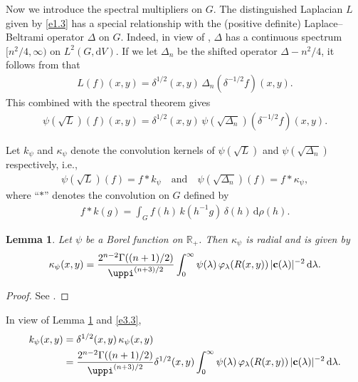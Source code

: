 \documentclass[a4paper,12pt]{amsart}
\numberwithin{equation}{section}
\newtheorem{lemma}[theorem]{Lemma}
\theoremstyle{definition}
\theoremstyle{remark}
\numberwithin{theorem}{section}
\newcommand{\R}{\mathbb{R}}
\newcommand{\dV}{\mathrm{d}V}
\newcommand{\bc}{\mathbf{c}}
\renewcommand{\d}{\mathrm{d}}
\begin{document}
Now we introduce the spectral multipliers on $G$. The distinguished Laplacian $L$ given by \eqref{e1.3} has a special relationship with the (positive definite) Laplace--Beltrami operator $\Delta $ on $G$. Indeed, in view of \cite[p. 177]{Da}, $\Delta$ has a continuous spectrum $[n^2/4,\infty)$ on $L^2(G,\dV)$. If we let $\Delta_n$ be the shifted operator $\Delta-n^2/4$, it follows from \cite[Proposition 2]{As} that
\begin{align*}
L(f)(x,y)=\delta^{1/2}(x,y)\, \Delta_n(\delta^{-1/2} f)(x,y).
\end{align*}
This combined with the spectral theorem gives
\begin{align}\label{e3.3}
\psi(\sqrt{L})(f)(x,y)=\delta^{1/2}(x,y)\,\psi(\sqrt{\Delta_n})(\delta^{-1/2}f)(x,y).
\end{align}

Let $k_\psi$ and $\kappa_\psi$ denote the convolution kernels of $\psi(\sqrt{L})$ and $\psi(\sqrt{\Delta_n})$ respectively, i.e.,
\begin{align*}
\psi(\sqrt{L})(f)=f*k_\psi\quad\mbox{and}\quad \psi(\sqrt{\Delta_n})(f)=f*\kappa_\psi,
\end{align*}
where ``$*$'' denotes the convolution on $G$ defined by
\begin{align}\label{con}
f*k(g)=\int_G f(h)\,k(h^{-1} g)\,\delta(h)\,\d\rho(h).
\end{align}
\begin{lemma}\label{lem3.1}
Let $\psi$ be a Borel function on $\R_+$. Then $\kappa_\psi$ is radial and is given by
\begin{align*}
\kappa_\psi(x,y)={2^{n-2}\Gamma((n+1)/2)\over\uppi^{(n+3)/2}}\int_0^\infty \psi(\lambda)\,\varphi_\lambda(R(x,y))\,|\bc(\lambda)|^{-2}\,\d \lambda.
\end{align*}
\end{lemma}
\begin{proof}
See \cite[Section 4]{Br}.
\end{proof}

In view of Lemma \ref{lem3.1} and \eqref{e3.3},
\begin{align}
k_\psi(x,y)&=\delta^{1/2}(x,y)\,\kappa_\psi(x,y)\notag\\
&={2^{n-2}\Gamma((n+1)/2)\over\uppi^{(n+3)/2}}\delta^{1/2}(x,y)\int_0^\infty \psi(\lambda)\,\varphi_\lambda(R(x,y))\,|\bc(\lambda)|^{-2}\,\d \lambda.\label{e3.4}
\end{align}
\smallskip
\end{document}
